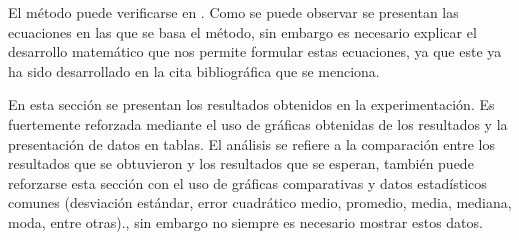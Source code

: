 \documentclass[times,5p, twocolumn]{elsarticle}
\begin{document}
El método puede verificarse en \cite{aguado}. Como se puede observar se presentan las ecuaciones en las que se basa el método, sin embargo es necesario explicar el desarrollo matemático que nos permite formular estas ecuaciones, ya que este ya ha sido desarrollado en la cita bibliográfica que se menciona.  



En esta sección se presentan los resultados obtenidos en la experimentación. Es fuertemente reforzada mediante el uso de gráficas obtenidas de los resultados y la presentación de datos en tablas. El análisis se refiere a la comparación entre los resultados que se obtuvieron y los resultados que se esperan, también puede reforzarse esta sección con el uso de gráficas comparativas y datos estadísticos comunes (desviación estándar, error cuadrático medio, promedio, media, mediana, moda, entre otras)., sin embargo no siempre es necesario mostrar estos datos.
\end{document}
